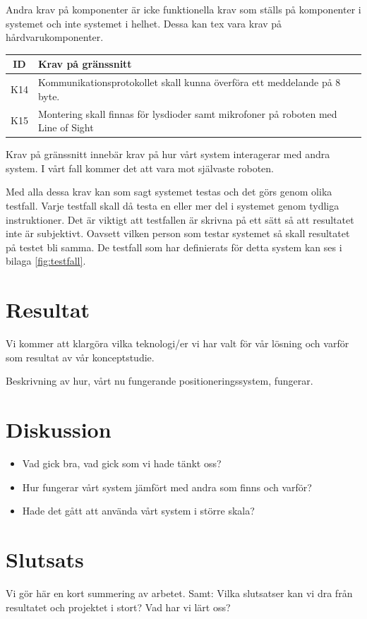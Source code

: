 \documentclass[11pt, a4paper]{report}
\begin{document}
Andra krav på komponenter är icke funktionella krav som ställs på komponenter i systemet och inte systemet i helhet. Dessa kan tex vara krav på hårdvarukomponenter.

\begin{center}
	\begin{tabular}{c | p{13.5cm}}
	ID & Krav på gränssnitt \\ \hline
	K14 & Kommunikationsprotokollet skall kunna överföra ett meddelande på 8 byte. \\
	K15 & Montering skall finnas för lysdioder samt mikrofoner på roboten med Line of Sight \\	
	\end{tabular}
\end{center}

Krav på gränssnitt innebär krav på hur vårt system interagerar med andra system. I vårt fall kommer det att vara mot självaste roboten.

Med alla dessa krav kan som sagt systemet testas och det görs genom olika testfall. Varje testfall skall då testa en eller mer del i systemet genom tydliga instruktioner. Det är viktigt att testfallen är skrivna på ett sätt så att resultatet inte är subjektivt. Oavsett vilken person som testar systemet så skall resultatet på testet bli samma. De testfall som har definierats för detta system kan ses i bilaga \ref{fig:testfall}.


\chapter{Resultat}
Vi kommer att klargöra vilka teknologi/er vi har valt för vår lösning och varför som resultat av vår konceptstudie.

Beskrivning av hur, vårt nu fungerande positioneringssystem, fungerar. 

\chapter{Diskussion}
\begin{itemize}
\item Vad gick bra, vad gick som vi hade tänkt oss?
\item Hur fungerar vårt system jämfört med andra som finns och varför?
\item Hade det gått att använda vårt system i större skala?
\end{itemize} 




\chapter{Slutsats}
Vi gör här en kort summering av arbetet.
Samt:
Vilka slutsatser kan vi dra från resultatet och projektet i stort?
Vad har vi lärt oss?
\end{document}
